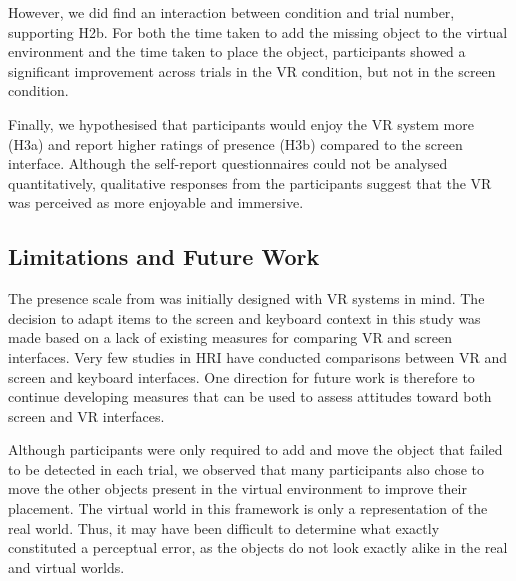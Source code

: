 \documentclass[letterpaper, 10 pt, conference]{ieeeconf}  %
\begin{document}
However, we did find an interaction between condition and trial number, supporting H2b. For both the time taken to add the missing object to the virtual environment and the time taken to place the object, participants showed a significant improvement across trials in the VR condition, but not in the screen condition. 


Finally, we hypothesised that participants would enjoy the VR system more (H3a) and report higher ratings of presence (H3b) compared to the screen interface. Although the self-report questionnaires could not be analysed quantitatively, qualitative responses from the participants suggest that the VR was perceived as more enjoyable and immersive. 







\subsection{Limitations and Future Work}
The presence scale from \cite{witmer1998measuring} was initially designed with VR systems in mind. The decision to adapt items to the screen and keyboard context in this study was made based on a lack of existing measures for comparing VR and screen interfaces. Very few studies in HRI have conducted comparisons between VR and screen and keyboard interfaces. One direction for future work is therefore to continue developing measures that can be used to assess attitudes toward both screen and VR interfaces.

Although participants were only required to add and move the object that failed to be detected in each trial, we observed that many participants also chose to move the other objects present in the virtual environment to improve their placement. The virtual world in this framework is only a representation of the real world. Thus, it may have been difficult to determine what exactly constituted a perceptual error, as the objects do not look exactly alike in the real and virtual worlds.  
\end{document}

